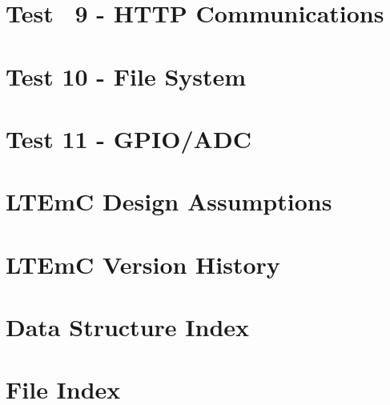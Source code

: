 \documentclass[twoside]{book}
\newcommand{\+}{\discretionary{\mbox{\scriptsize$\hookleftarrow$}}{}{}}
\begin{document}
\chapter{Test ~9 -\/ HTTP Communications}
\label{md__c___users__greg_terrell__documents__code_dev__arduino_libraries__loo_u_q__l_t_em_c_tests_ltemc_09_http__r_e_a_d_m_e}

\chapter{Test 10 -\/ File System}
\label{md__c___users__greg_terrell__documents__code_dev__arduino_libraries__loo_u_q__l_t_em_c_tests_ltemc_10_files__r_e_a_d_m_e}

\chapter{Test 11 -\/ GPIO/\+ADC}
\label{md__c___users__greg_terrell__documents__code_dev__arduino_libraries__loo_u_q__l_t_em_c_tests_ltemc_11_gpio__r_e_a_d_m_e}

\chapter{LTEmC Design Assumptions}
\label{md__l_t_em_c__design__assumptions}

\chapter{LTEmC Version History}
\label{md_version_history}

\chapter{Data Structure Index}

\chapter{File Index}

\end{document}
